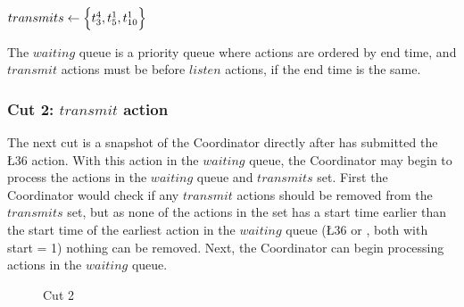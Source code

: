 $transmits \leftarrow \Big\{ t^{4}_{3}, t^{1}_{5}, t^{1}_{10} \Big\}$ \smallbreak

The $waiting$ queue is a priority queue where actions are ordered by end time, and $transmit$ actions must be before $listen$ actions, if the end time is the same.

\subsubsection{Cut 2: $transmit$ action}
The next cut is a snapshot of the Coordinator directly after  has submitted the \L{3}{6} action. With this action in the $waiting$ queue, the Coordinator may begin to process the actions in the $waiting$ queue and $transmits$ set. First the Coordinator would check if any $transmit$ actions should be removed from the $transmits$ set, but as none of the actions in the set has a start time earlier than the start time of the earliest action in the $waiting$ queue (\L{3}{6} or , both with start = 1) nothing can be removed. Next, the Coordinator can begin processing actions in the $waiting$ queue. %

\begin{figure}[H]
    \centering

    \caption{Cut 2}\label{tikz:coordinatormsc2}
\end{figure}


